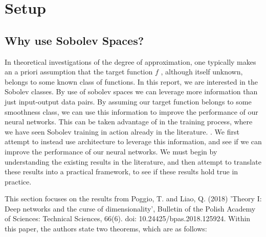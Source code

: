 \documentclass[11pt,a4paper]{article}
\theoremstyle{plain}
\theoremstyle{definition}
\theoremstyle{remark}
\begin{document}

\pagebreak

\section{Setup}

\subsection{Why use Sobolev Spaces?}

In theoretical investigations of the degree of approximation, one typically makes an a priori assumption that the target function \(f\) , although itself unknown, belongs to some known class of functions. In this report, we are interested in the Sobolev classes.
By use of sobolev spaces we can leverage more information than just input-output data pairs. By assuming our target function belongs to some smoothness class, we can use this information to improve the performance of our neural networks. This can be taken advantage of in the training process, where we have seen Sobolev training in action already in the literature. \cite{enwiki:1223692835}. We first attempt to instead use architecture to leverage this information, and see if we can improve the performance of our neural networks. We must begin by understanding the existing results in the literature, and then attempt to translate these results into a practical framework, to see if these results hold true in practice.

This section focuses on the results from Poggio, T. and Liao, Q. (2018) 'Theory I: Deep networks and the curse of dimensionality', Bulletin of the Polish Academy of Sciences: Technical Sciences, 66(6). doi: 10.24425/bpas.2018.125924. Within this paper, the authors state two theorems, which are as follows:
\end{document}
